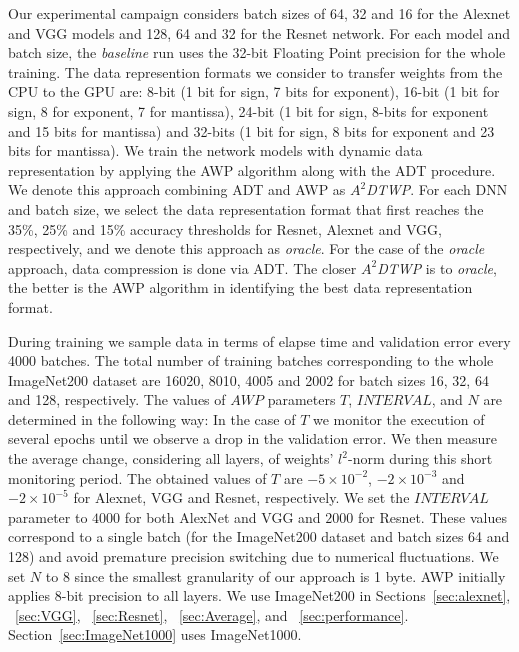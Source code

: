 Our experimental campaign considers batch sizes of 64, 32 and 16 for the Alexnet and VGG models and 128, 64 and 32 for the Resnet network.
For each model and batch size, the \emph{baseline} run uses the 32-bit Floating Point precision for the whole training. 
The data represention formats we consider to transfer weights from the CPU to the GPU are:
8-bit (1 bit for sign, 7 bits for exponent), 16-bit (1 bit for sign, 8 for exponent, 7 for mantissa), 24-bit (1 bit for sign, 8-bits for exponent and 15 bits for mantissa) and 32-bits (1 bit for sign, 8 bits for exponent and 23 bits for mantissa).
We train the network models with dynamic data representation by applying the AWP algorithm along with the ADT procedure.
We denote this approach combining ADT and AWP as \textit{$A^2$DTWP}.  
For each DNN and batch size, we select the data representation format that first 
reaches the 35\%, 25\% and 15\% accuracy thresholds for Resnet, Alexnet and VGG, respectively, and we 
denote this approach as \emph{oracle}.
For the case of the \emph{oracle} approach, data compression is done via ADT.
The closer \textit{$A^2$DTWP} is to \emph{oracle}, the better is the AWP algorithm in identifying the best data representation format.

During training we sample data in terms of elapse time and validation error every 4000 batches. 
The total number of training batches corresponding to the whole ImageNet200 dataset are 16020, 8010, 4005 and 2002 for batch sizes 16, 32, 64 and 128, respectively.
The values of $AWP$ parameters $T$, $INTERVAL$, and $N$ are determined in the following way:
In the case of $T$ we monitor the execution of several epochs until we observe a drop in the validation error. 
We then measure the average change, considering all layers, of weights' $l^2$-norm during this short monitoring period.
The obtained values of $T$ are $-5\times10^{-2}$, $-2\times10^{-3}$ and $-2\times10^{-5}$ for Alexnet, VGG and Resnet, respectively.
We set the $INTERVAL$ parameter to $4000$ for both AlexNet and VGG and $2000$ for Resnet. 
These values correspond to a single batch (for the ImageNet200 dataset and batch sizes 64 and 128) and avoid premature precision switching due to numerical fluctuations.  
We set $N$ to $8$ since the smallest granularity of our approach is 1 byte.
AWP initially applies 8-bit precision to all layers.
We use ImageNet200 in Sections~\ref{sec:alexnet}, ~\ref{sec:VGG}, ~\ref{sec:Resnet}, ~\ref{sec:Average}, and ~\ref{sec:performance}.
Section~\ref{sec:ImageNet1000} uses ImageNet1000.

